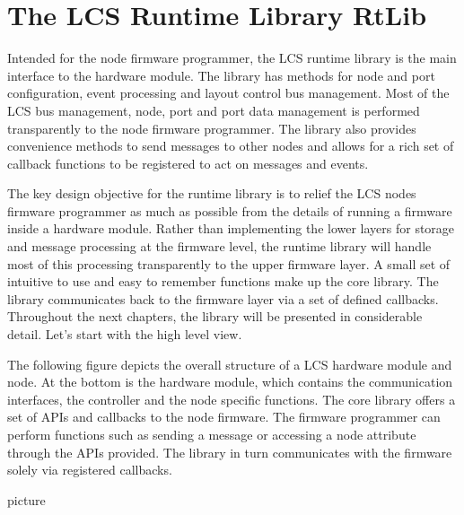 \chapter{The LCS Runtime Library RtLib}

Intended for the node firmware programmer, the LCS runtime library is the main interface to the hardware module. The library has methods for node and port configuration, event processing and layout control bus management. Most of the LCS bus management, node, port and port data management is performed transparently to the node firmware programmer. The library also provides convenience methods to send messages to other nodes and allows for a rich set of callback functions to be registered to act on messages and events.

The key design objective for the runtime library is to relief the LCS nodes firmware programmer as much as possible from the details of running a firmware inside a hardware module. Rather than implementing the lower layers for storage and message processing at the firmware level, the runtime library will handle most of this processing transparently to the upper firmware layer. A small set of intuitive to use and easy to remember functions make up the core library. The library communicates back to the firmware layer via a set of defined callbacks. Throughout the next chapters, the library will be presented in considerable detail. Let's start with the high level view.

The following figure depicts the overall structure of a LCS hardware module and node. At the bottom is the hardware module, which contains the communication interfaces, the controller and the node specific functions. The core library offers a set of APIs and callbacks to the node firmware. The firmware programmer can perform functions such as sending a message or accessing a node attribute through the APIs provided. The library in turn communicates with the firmware solely via registered callbacks.

picture 

\begin{figure}[h]
    \centering
\end{figure}

